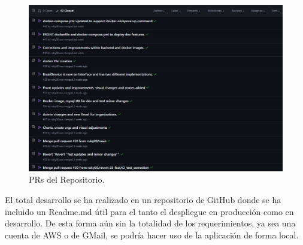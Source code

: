 \begin{figure}[h]
    \centering
    \includegraphics[width=\linewidth]{PRs.png}
    \caption{PRs del Repositorio.}
    \label{fig:metodologias2}
\end{figure}

El total desarrollo se ha realizado en un repositorio de GitHub donde se ha incluido un Readme.md útil para el tanto el despliegue en producción como en desarrollo. De esta forma
aún sin la totalidad de los requerimientos, ya sea una cuenta de AWS o de GMail, se podría hacer uso de la aplicación de forma local.


